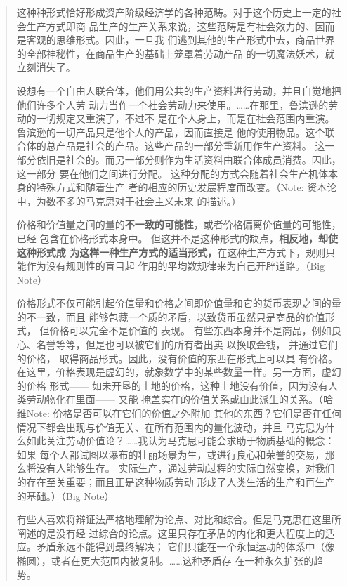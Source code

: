 \begin{quotation}
这种种形式恰好形成资产阶级经济学的各种范畴。对于这个历史上一定的社会生产方式即商
品生产的生产关系来说，这些范畴是有社会效力的、因而是客观的思维形式。因此，一旦我
们逃到其他的生产形式中去，商品世界的全部神秘性，在商品生产的基础上笼罩着劳动产品
的一切魔法妖术，就立刻消失了。

设想有一个自由人联合体，他们用公共的生产资料进行劳动，并且自觉地把他们许多个人劳
动力当作一个社会劳动力来使用。……在那里，鲁滨逊的劳动的一切规定又重演了，不过不
是在个人身上，而是在社会范围内重演。鲁滨逊的一切产品只是他个人的产品，因而直接是
他的使用物品。这个联合体的总产品是社会的产品。这些产品的一部分重新用作生产资料。
这一部分依旧是社会的。而另一部分则作为生活资料由联合体成员消费。因此， 这一部分
要在他们之间进行分配。 这种分配的方式会随着社会生产机体本身的特殊方式和随着生产
者的相应的历史发展程度而改变。（Note: 资本论中，为数不多的马克思对于社会主义未来
的描述。）

价格和价值量之间的量的\textbf{不一致的可能性}，或者价格偏离价值量的可能性，已经
包含在价格形式本身中。 但这并不是这种形式的缺点，\textbf{相反地，却使这种形式成
为这样一种生产方式的适当形式，}在这种生产方式下，规则只能作为没有规则性的盲目起
作用的平均数规律来为自己开辟道路。（Big Note）

价格形式不仅可能引起价值量和价格之间即价值量和它的货币表现之间的量的不一致，而且
能够包藏一个质的矛盾，以致货币虽然只是商品的价值形式， 但价格可以完全不是价值的
表现。 有些东西本身并不是商品，例如良心、名誉等等，但是也可以被它们的所有者出卖
以换取金钱， 并通过它们的价格， 取得商品形式。因此，没有价值的东西在形式上可以具
有价格。在这里，价格表现是虚幻的，就象数学中的某些数量一样。另一方面，虚幻的价格
形式—— 如未开垦的土地的价格，这种土地没有价值，因为没有人类劳动物化在里面—— 又能
掩盖实在的价值关系或由此派生的关系。（哈维Note: 价格是否可以在它们的价值之外附加
其他的东西？它们是否在任何情况下都会出现与价值无关、在所有范围内的量化波动，并且
马克思为什么如此关注劳动价值论？……我认为马克思可能会求助于物质基础的概念：如果
每个人都试图以瀑布的壮丽场景为生，或进行良心和荣誉的交易，那么将没有人能够生存。
实际生产，通过劳动过程的实际自然变换，对我们的存在至关重要；而且正是这种物质劳动
形成了人类生活的生产和再生产的基础。）（Big Note）

有些人喜欢将辩证法严格地理解为论点、对比和综合。但是马克思在这里所阐述的是没有经
过综合的论点。这里只存在矛盾的内化和更大程度上的适应。矛盾永远不能得到最终解决；
它们只能在一个永恒运动的体系中（像椭圆），或者在更大范围内被复制。……这种矛盾存
在一种永久扩张的趋势。


\end{quotation}
